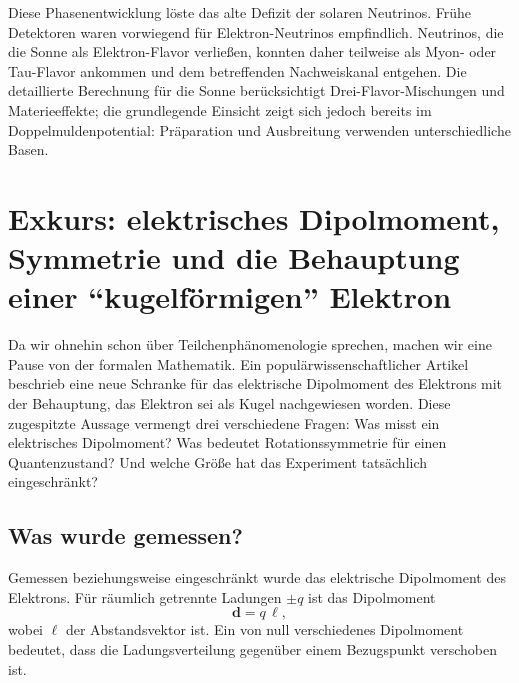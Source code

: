 \begin{classroomqa}
\end{classroomqa}

Diese Phasenentwicklung löste das alte Defizit der solaren Neutrinos. Frühe Detektoren waren vorwiegend für Elektron-Neutrinos empfindlich. Neutrinos, die die Sonne als Elektron-Flavor verließen, konnten daher teilweise als Myon- oder Tau-Flavor ankommen und dem betreffenden Nachweiskanal entgehen. Die detaillierte Berechnung für die Sonne berücksichtigt Drei-Flavor-Mischungen und Materieeffekte; die grundlegende Einsicht zeigt sich jedoch bereits im Doppelmuldenpotential: Präparation und Ausbreitung verwenden unterschiedliche Basen.

\section{Exkurs: elektrisches Dipolmoment, Symmetrie und die Behauptung einer ``kugelförmigen'' Elektron}

Da wir ohnehin schon über Teilchenphänomenologie sprechen, machen wir eine Pause von der formalen Mathematik. Ein populärwissenschaftlicher Artikel beschrieb eine neue Schranke für das elektrische Dipolmoment des Elektrons mit der Behauptung, das Elektron sei als Kugel nachgewiesen worden. Diese zugespitzte Aussage vermengt drei verschiedene Fragen: Was misst ein elektrisches Dipolmoment? Was bedeutet Rotationssymmetrie für einen Quantenzustand? Und welche Größe hat das Experiment tatsächlich eingeschränkt?

\subsection{Was wurde gemessen?}

Gemessen beziehungsweise eingeschränkt wurde das elektrische Dipolmoment des Elektrons. Für räumlich getrennte Ladungen \(\pm q\) ist das Dipolmoment
\begin{equation}
\mathbf d = q\,\boldsymbol{\ell},
\end{equation}
wobei \(\boldsymbol{\ell}\) der Abstandsvektor ist. Ein von null verschiedenes Dipolmoment bedeutet, dass die Ladungsverteilung gegenüber einem Bezugspunkt verschoben ist.

